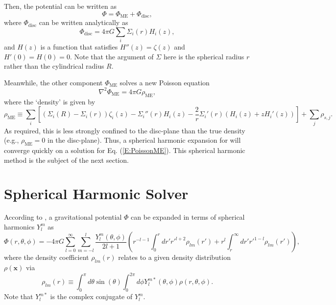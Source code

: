 \documentclass[11pt,a4paper]{article}
\begin{document}
Then, the potential can be written as
\begin{equation}
    \Phi = \Phi_\mathrm{ME} + \Phi_\mathrm{disc},
\end{equation}
where $\Phi_\mathrm{disc}$ can be written analytically as
\begin{equation}
    \Phi_\mathrm{disc} = 4\pi G \sum_i \Sigma_i(r)H_i(z),
\end{equation}
and $H(z)$ is a function that satisfies $H''(z) = \zeta(z)$ and $H'(0)=H(0)=0$. Note that the argument of $\Sigma$ here is the spherical radius $r$ rather than the cylindrical radius $R$.

Meanwhile, the other component $\Phi_\mathrm{ME}$ solves a new Poisson equation
\begin{equation}
\label{E:PoissonME}
    \nabla^2 \Phi_\mathrm{ME} = 4\pi G \rho_\mathrm{ME},
\end{equation}
where the `density' is given by
\begin{equation}
\label{E:rho_ME}
    \rho_\mathrm{ME} \equiv \sum_i \left[\left(\Sigma_i(R)-\Sigma_i(r)\right)\zeta_i(z) - \Sigma_i''(r)H_i(z) - \frac{2}{r}\Sigma_i'(r)\left(H_i(z) + zH_i'(z)\right)\right] + \sum_j \rho_{s,j}.
\end{equation}
As required, this is less strongly confined to the disc-plane than the true density (e.g., $\rho_\mathrm{ME}=0$ in the disc-plane). Thus, a spherical harmonic expansion for will converge quickly on a solution for Eq. (\ref{E:PoissonME}). This spherical harmonic method is the subject of the next section.

\section{Spherical Harmonic Solver}

According to \citet[][Eq. 2.95]{Binney2008}, a gravitational potential $\Phi$ can be expanded in terms of spherical harmonics $Y_l^m$ as
\begin{equation}
\label{E:phi_sh_full}
    \Phi(r, \theta, \phi) = - 4\pi G \sum_{l=0}^\infty \sum_{m=-l}^l \frac{Y_l^m(\theta,\phi)}{2l+1}\left(r^{-l-1}\int_0^r dr' r'^{l+2} \rho_{lm}(r')+ r^l\int_r^\infty dr' r'^{1-l} \rho_{lm}(r') \right),
\end{equation}
where the density coefficient $\rho_{lm}(r)$ relates to a given density distribution $\rho(\bm{x})$ via
\begin{equation}
\label{E:rholm}
    \rho_{lm}(r) \equiv \int_0^\pi d\theta \sin(\theta) \int_0^{2\pi} d\phi Y_l^{m*}(\theta,\phi)\rho(r, \theta, \phi).
\end{equation}
Note that $Y_l^{m*}$ is the complex conjugate of $Y_l^{m}$.
\end{document}

